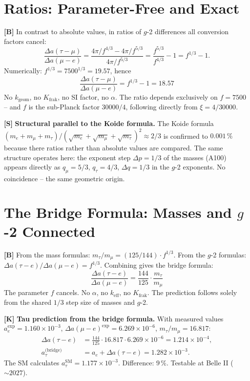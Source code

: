 \section{Ratios: Parameter-Free and Exact}

\textbf{[B]} In contrast to absolute values, in ratios of $g$-2 differences all
conversion factors cancel:
\[
  \frac{\Delta a(\tau-\mu)}{\Delta a(\mu-e)}
  = \frac{4\pi/f^{4/3}-4\pi/f^{5/3}}{4\pi/f^{5/3}}
  = \frac{f^{5/3}}{f^{4/3}} - 1
  = f^{1/3} - 1.
\]
Numerically: $f^{1/3}=7500^{1/3}=19{.}57$, hence
\[
  \boxed{\;\frac{\Delta a(\tau-\mu)}{\Delta a(\mu-e)} = f^{1/3}-1 = 18{.}57\;}
\]
No $k_\text{geom}$, no $K_\text{frak}$, no SI factor, no $\alpha$. The ratio
depends exclusively on $f=7500$ -- and $f$ is the sub-Planck factor $30000/4$,
following directly from $\xi=4/30000$.

\textbf{[S]} \textbf{Structural parallel to the Koide formula.} The Koide formula
$(m_e+m_\mu+m_\tau)/(\sqrt{m_e}+\sqrt{m_\mu}+\sqrt{m_\tau})^2\approx2/3$
is confirmed to $0{.}001\,\%$ because there ratios rather than absolute values are
compared. The same structure operates here: the exponent step $\Delta p=1/3$ of
the masses (A100) appears directly as $q_\mu=5/3$, $q_\tau=4/3$, $\Delta q=1/3$
in the $g$-2 exponents. No coincidence -- the same geometric origin.

\section{The Bridge Formula: Masses and \texorpdfstring{$g$-2}{g-2} Connected}

\textbf{[B]} From the mass formulas: $m_\tau/m_\mu=(125/144)\cdot f^{1/3}$.
From the $g$-2 formulas: $\Delta a(\tau-e)/\Delta a(\mu-e)=f^{1/3}$.
Combining gives the bridge formula:
\[
  \boxed{\;\frac{\Delta a(\tau-e)}{\Delta a(\mu-e)} = \frac{144}{125}\cdot\frac{m_\tau}{m_\mu}\;}
\]
The parameter $f$ cancels. No $\alpha$, no $k_\text{eff}$, no $K_\text{frak}$.
The prediction follows solely from the shared $1/3$ step size of masses and $g$-2.

\textbf{[K]} \textbf{Tau prediction from the bridge formula.} With measured values
$a_e^\text{exp}=1{.}160\times10^{-3}$,
$\Delta a(\mu-e)^\text{exp}=6{.}269\times10^{-6}$,
$m_\tau/m_\mu=16{.}817$:
\begin{align*}
  \Delta a(\tau-e) &= \frac{144}{125}\cdot16{.}817\cdot6{.}269\times10^{-6}
  = 1{.}214\times10^{-4},\\
  a_\tau^\text{(bridge)} &= a_e + \Delta a(\tau-e)
  = \boxed{1{.}282\times10^{-3}}.
\end{align*}
The SM calculates $a_\tau^\text{SM}=1{.}177\times10^{-3}$. Difference: $9\,\%$.
Testable at Belle II ($\sim2027$).

